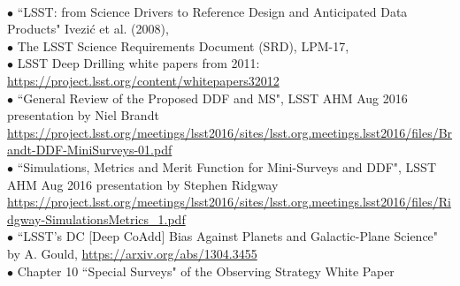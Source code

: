 \documentclass[DM,lsstdraft,toc]{lsstdoc}
\begin{document}
 \\
$\bullet$ ``LSST: from Science Drivers to Reference Design and Anticipated Data Products" Ivezi\'{c} et al. (2008), \cite{2008arXiv0805.2366I} \\
$\bullet$ The LSST Science Requirements Document (SRD), LPM-17, \cite{LPM-17} \\
$\bullet$ LSST Deep Drilling white papers from 2011: \url{https://project.lsst.org/content/whitepapers32012} \\
$\bullet$ ``General Review of the Proposed DDF and MS", LSST AHM Aug 2016 presentation by Niel Brandt \url{https://project.lsst.org/meetings/lsst2016/sites/lsst.org.meetings.lsst2016/files/Brandt-DDF-MiniSurveys-01.pdf} \\
$\bullet$ ``Simulations, Metrics and Merit Function for Mini-Surveys and DDF", LSST AHM Aug 2016 presentation by Stephen Ridgway \url{https://project.lsst.org/meetings/lsst2016/sites/lsst.org.meetings.lsst2016/files/Ridgway-SimulationsMetrics_1.pdf} \\
$\bullet$ ``LSST's DC [Deep CoAdd] Bias Against Planets and Galactic-Plane Science" by A. Gould, \cite{2013arXiv1304.3455G} \url{https://arxiv.org/abs/1304.3455} \\
$\bullet$ Chapter 10 ``Special Surveys" of the Observing Strategy White Paper \cite{2017arXiv170804058L}
\end{document}
